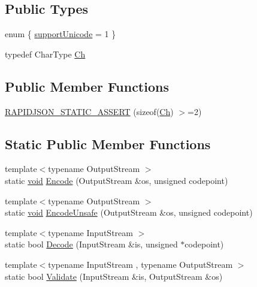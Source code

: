 \subsection*{Public Types}
\begin{DoxyCompactItemize}
\item 
enum \{ \hyperlink{structUTF16_a34817dbbc470e278ad65aff8db6ebdcfa98b69a56ef3548af9741fff3fcb7b28c}{support\+Unicode} = 1
 \}
\item 
typedef Char\+Type \hyperlink{structUTF16_a811680d50447c98be4fd94c0a27504bb}{Ch}
\end{DoxyCompactItemize}
\subsection*{Public Member Functions}
\begin{DoxyCompactItemize}
\item 
\hyperlink{structUTF16_a04aeeefa5dcba7c5156bc78a5c1f1557}{R\+A\+P\+I\+D\+J\+S\+O\+N\+\_\+\+S\+T\+A\+T\+I\+C\+\_\+\+A\+S\+S\+E\+RT} (sizeof(\hyperlink{structUTF16_a811680d50447c98be4fd94c0a27504bb}{Ch}) $>$=2)
\end{DoxyCompactItemize}
\subsection*{Static Public Member Functions}
\begin{DoxyCompactItemize}
\item 
{\footnotesize template$<$typename Output\+Stream $>$ }\\static \hyperlink{imgui__impl__opengl3__loader_8h_ac668e7cffd9e2e9cfee428b9b2f34fa7}{void} \hyperlink{structUTF16_a9d8ded01244e30d037c4afa10ee2b30e}{Encode} (Output\+Stream \&os, unsigned codepoint)
\item 
{\footnotesize template$<$typename Output\+Stream $>$ }\\static \hyperlink{imgui__impl__opengl3__loader_8h_ac668e7cffd9e2e9cfee428b9b2f34fa7}{void} \hyperlink{structUTF16_aa67661e756c273871b574e7133b7fc63}{Encode\+Unsafe} (Output\+Stream \&os, unsigned codepoint)
\item 
{\footnotesize template$<$typename Input\+Stream $>$ }\\static bool \hyperlink{structUTF16_a124c79dfd9f9b4c3fb65bd55ba17b4be}{Decode} (Input\+Stream \&is, unsigned $\ast$codepoint)
\item 
{\footnotesize template$<$typename Input\+Stream , typename Output\+Stream $>$ }\\static bool \hyperlink{structUTF16_a7516184ed5dce10c0e7895bec124d97d}{Validate} (Input\+Stream \&is, Output\+Stream \&os)
\end{DoxyCompactItemize}


